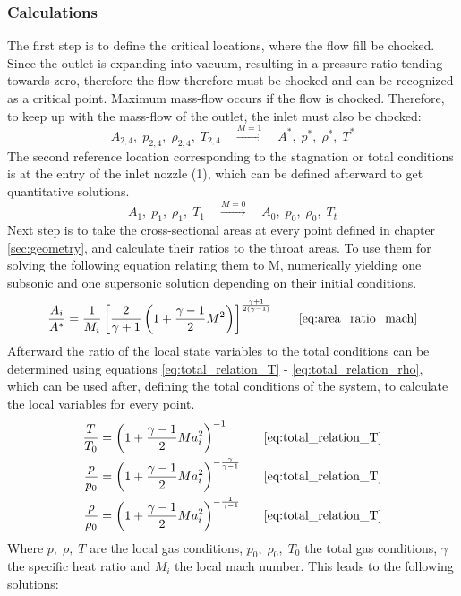 \subsubsection*{Calculations}

	The first step is to define the critical locations, where the flow fill be chocked.
	Since the outlet is expanding into vacuum, resulting in a pressure ratio tending towards zero, therefore the flow therefore must be chocked and can be recognized as a critical point.
	Maximum mass-flow occurs if the flow is chocked. Therefore, to keep up with the mass-flow of the outlet, the inlet must also be chocked: 
	$$
		A_{2,4},\;p_{2,4},\;\rho_{2,4},\;T_{2,4}\quad\xrightarrow{M=1}\quad A^*,\;p^*,\;\rho^*,\;T^*
	$$
	The second reference location corresponding to the stagnation or total conditions is at the entry of the inlet nozzle (1), which can be defined afterward to get quantitative solutions.
	$$
		A_1,\;p_1,\;\rho_1,\;T_1\quad\xrightarrow{M=0}\quad A_0,\;p_0,\;\rho_0,\;T_t
	$$
	Next step is to take the cross-sectional areas at every point defined in chapter \ref{sec:geometry}, and calculate their ratios to the throat areas.
	To use them for solving the following equation relating them to M, numerically yielding one subsonic and one supersonic solution depending on their initial conditions.
	$$
		\frac{A_i}{A^*} = \frac{1}{M_i} \left[ \frac{2}{\gamma + 1} \left( 1 + \frac{\gamma - 1}{2} M^2 \right) \right]^{\frac{\gamma + 1}{2(\gamma - 1)}}
		\qquad \eqref{eq:area_ratio_mach}
	$$
	Afterward the ratio of the local state variables to the total conditions can be determined using equations \eqref{eq:total_relation_T} - \eqref{eq:total_relation_rho}, which can be used after, defining the total conditions of the system, to calculate the local variables for every point.
	\cite{hall_isentropic_nodate}
	\begin{alignat*}{2}
	    \frac{T}{T_0}   & = \left( 1 + \frac{\gamma - 1}{2} Ma_i^2 \right)^{-1}\qquad &\eqref{eq:total_relation_T}\\
	    \frac{p}{p_0}   & = \left( 1 + \frac{\gamma - 1}{2} Ma_i^2 \right)^{-\frac{\gamma}{\gamma - 1}}&\eqref{eq:total_relation_T}\\
	    \frac{\rho}{\rho_0} & = \left( 1 + \frac{\gamma - 1}{2} Ma_i^2 \right)^{-\frac{1}{\gamma - 1}}&\eqref{eq:total_relation_T}
	\end{alignat*}
	Where $p,\; \rho,\; T$ are the local gas conditions, $p_0,\; \rho_0,\; T_0$ the total gas conditions, $\gamma$ the specific heat ratio and $M_i$ the local mach number.
	This leads to the following solutions:
